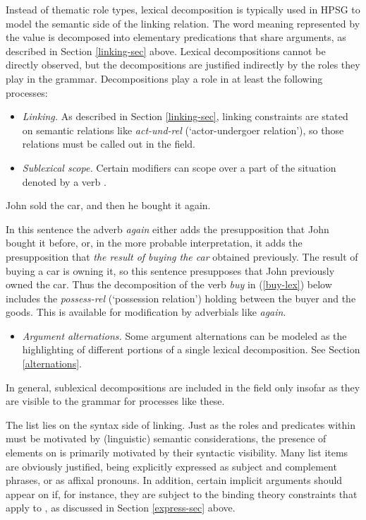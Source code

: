 \documentclass[output=paper
                ,modfonts
                ,nonflat
	        ,collection
	        ,collectionchapter
	        ,collectiontoclongg
 	        ,biblatex
                ,babelshorthands
                ,newtxmath
                ,draftmode
                ,colorlinks, citecolor=brown
]{./langsci/langscibook}
\begin{document}
Instead of thematic role types, lexical decomposition is typically used in HPSG to model the semantic side of the linking relation.  The word meaning represented by the \content value is decomposed into elementary predications that share arguments, as described in Section \ref{linking-sec} above.  Lexical decompositions cannot be directly observed, but the decompositions are justified indirectly by the roles they play in the grammar.  Decompositions play a role in at least the following processes:

\begin{itemize}
\item  \textit{Linking.}  As described in Section \ref{linking-sec}, linking constraints are stated on semantic relations like \textit{act-und-rel} (`actor-undergoer relation'), so those relations must be called out in the \content field.
\item \textit{Sublexical scope.}  Certain modifiers can scope over a part of the situation denoted by a verb \citep{Dowty:1979a}.  
\end{itemize}

\begin{exe}
\label{again}
\ex John sold the car, and then he bought it again.
\end{exe}

In this sentence the adverb \textit{again} either adds the presupposition that John bought it before, or, in the more probable interpretation, it adds the presupposition that \textit{the result of buying the car} obtained previously.  The result of buying a car is owning it, so this sentence presupposes that John previously owned the car. Thus the decomposition of the verb \textit{buy} in (\ref{buy-lex}) below includes the \textit{possess-rel} (`possession relation') holding between the buyer and the goods.  This is available for modification by adverbials like \textit{again}.

\begin{itemize}
\item \textit{Argument alternations.}  Some argument alternations can be modeled as the highlighting of different portions of a single lexical decomposition.  See Section \ref{alternations}.  
\end{itemize}  

\noindent
In general, sublexical decompositions are included in the \content field only insofar as they are visible to the grammar for processes like these.  

The \argst list lies on the syntax side of linking.  Just as the roles and predicates within \content must be motivated by (linguistic) semantic considerations, the presence of elements on \argst is primarily motivated by their syntactic visibility.  Many \argst list items are obviously justified, being explicitly expressed as subject and complement phrases, or as affixal pronouns.  In addition, certain implicit arguments should appear on \argst if, for instance, they are subject to the binding theory constraints that apply to \argst, as discussed in Section \ref{express-sec} above.
\end{document}
